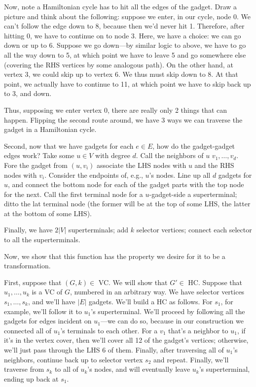\documentclass{article}
\begin{document}
Now, note a Hamiltonian cycle has to hit all the edges of the gadget.
Draw a picture and think about the following:
suppose we enter, in our cycle, node 0. We can't follow the edge down to
8, because then we'd never hit 1.
Therefore, after hitting 0, we have to continue on to node 3.
Here, we have a choice: we can go down or up to 6.
Suppose we go down---by similar logic to above, we have to go all the way down to 5,
at which point we have to leave 5 and go somewhere else (covering the
RHS vertices by some analogous path).
On the other hand, at vertex 3, we could skip up to vertex 6. We thus must
skip down to 8. At that point, we actually have to continue to 11, at which
point we have to skip back up to 3, and down.

Thus, supposing we enter vertex 0, there are really only 2 things that can 
happen.
Flipping the second route around, we have 3 ways we can traverse the
gadget in a Hamiltonian cycle.

Second, now that we have gadgets for each $e\in E$, how do the gadget-gadget 
edges work?
Take some $u\in V$ with degree $d$. Call the neighbors of $u$
$v_1,\ldots,v_d$.
Fore the gadget from $(u,v_i)$ associate the LHS nodes with $u$ and the
RHS nodes with $v_i$.
Consider the endpoints of, e.g., $u$'s nodes.
Line up all $d$ gadgets for $u$, and connect the bottom node for
each of the gadget parts with the top node for the next.
Call the first terminal node for a $u$-gadget-side a superterminal; ditto
the lat terminal node (the former will be at the top of some LHS, the
latter at the bottom of some LHS).

Finally, we have $2|V|$ superterminals; add $k$ selector vertices;
connect each selector to all the superterminals.

Now, we show that this function has the property we desire for it
to be a transformation.

First, suppose that $(G,k)\in$ VC. We will show that $G'\in$ HC.
Suppose that $u_1,\ldots,u_k$ is a VC of $G$, numbered in an arbitrary
way.
We have selector vertices $s_1,\ldots,s_k$, and we'll have $|E|$ gadgets.
We'll build a HC as follows.
For $s_1$, for example, we'll follow it to $u_1$'s superterminal.
We'll proceed by following all the gadgets for edges incident on
$u_1$---we can do so, because in our construction we connected all of
$u_1$'s terminals to each other.
For a $v_1$ that's a neighbor to $u_1$, if it's in the vertex
cover, then we'll cover all 12 of the gadget's vertices; otherwise,
we'll just pass through the LHS 6 of them.
Finally, after traversing all of $u_1$'s neighbors, continue back up
to selector vertex $s_2$ and repeat.
Finally, we'll traverse from $s_k$ to all of $u_k$'s nodes, and will eventually
leave $u_k$'s superterminal, ending up back at $s_1$.
\end{document}
